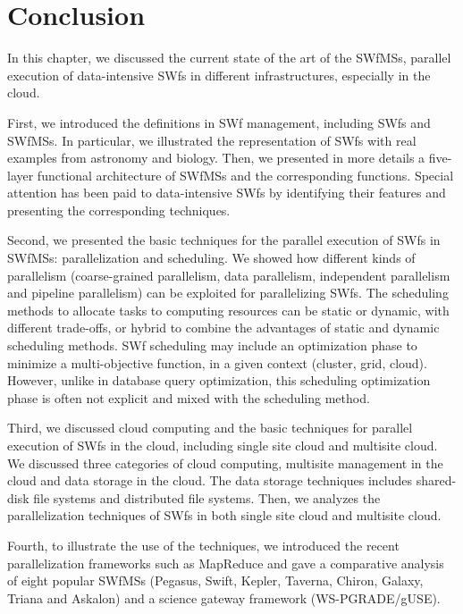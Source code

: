 \section{Conclusion}
\label{sec:SOACon}

In this chapter, we discussed the current state of the art of the SWfMSs, parallel execution of data-intensive SWfs in different infrastructures, especially in the cloud.

First, we introduced the definitions in SWf management, including SWfs and SWfMSs. In particular, we illustrated the representation of SWfs with real examples from astronomy and biology.
Then, we presented in more details
a five-layer functional architecture of SWfMSs
and the corresponding functions.
Special attention has been paid to data-intensive SWfs
by identifying their features and presenting the corresponding
techniques.

Second, we presented the basic techniques for the parallel
execution of SWfs in SWfMSs: parallelization and scheduling. 
We showed how different kinds of parallelism (coarse-grained parallelism, data parallelism, independent parallelism and pipeline parallelism) can be exploited for
parallelizing SWfs. The scheduling methods to
allocate tasks to computing resources can be static or dynamic, with
different trade-offs, or hybrid to combine the advantages of static and dynamic scheduling methods.
SWf scheduling may include an optimization phase to
minimize a multi-objective function, in a given context (cluster, grid, cloud).
However, unlike in database query optimization, this scheduling optimization phase is often not explicit and mixed with the scheduling method. 

Third, we discussed cloud computing and the basic techniques for parallel execution of SWfs in the cloud, 
including single site cloud and multisite cloud. We discussed three categories of cloud computing, multisite management in the cloud and data storage in the cloud. The data storage techniques includes shared-disk file systems and distributed file systems. Then, we analyzes the parallelization techniques of SWfs in both single site cloud and multisite cloud. 

Fourth, to illustrate the use of the techniques, we introduced the recent parallelization frameworks such as MapReduce and gave a comparative analysis of eight popular SWfMSs (Pegasus, Swift, Kepler, Taverna, Chiron, Galaxy, Triana and Askalon) and a science gateway framework (WS-PGRADE/gUSE).

